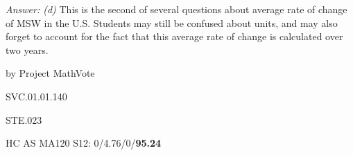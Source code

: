 {\it Answer:  (d)}  This is the second of several questions about average rate of change of MSW in the U.S.  Students may still be confused about units, and may also forget to account for the fact that this average rate of change is calculated over two years.

\medskip
by Project MathVote

SVC.01.01.140

STE.023

HC AS MA120 S12: 0/4.76/0/{\bf95.24}  \\
